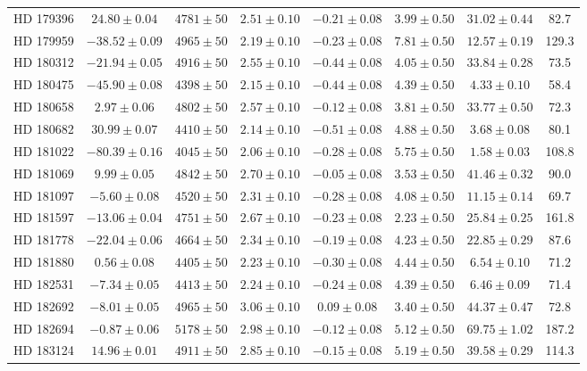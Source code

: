 \begin{table*}
\begin{tabular}{cccccccc}
HD 179396 & $24.80 \pm 0.04$ & $4781 \pm 50$ & $2.51 \pm 0.10$ & $-0.21 \pm 0.08$ & $3.99 \pm 0.50$ & $31.02 \pm 0.44$ & 82.7 \\
HD 179959 & $-38.52 \pm 0.09$ & $4965 \pm 50$ & $2.19 \pm 0.10$ & $-0.23 \pm 0.08$ & $7.81 \pm 0.50$ & $12.57 \pm 0.19$ & 129.3 \\
HD 180312 & $-21.94 \pm 0.05$ & $4916 \pm 50$ & $2.55 \pm 0.10$ & $-0.44 \pm 0.08$ & $4.05 \pm 0.50$ & $33.84 \pm 0.28$ & 73.5 \\
HD 180475 & $-45.90 \pm 0.08$ & $4398 \pm 50$ & $2.15 \pm 0.10$ & $-0.44 \pm 0.08$ & $4.39 \pm 0.50$ & $4.33 \pm 0.10$ & 58.4 \\
HD 180658 & $2.97 \pm 0.06$ & $4802 \pm 50$ & $2.57 \pm 0.10$ & $-0.12 \pm 0.08$ & $3.81 \pm 0.50$ & $33.77 \pm 0.50$ & 72.3 \\
HD 180682 & $30.99 \pm 0.07$ & $4410 \pm 50$ & $2.14 \pm 0.10$ & $-0.51 \pm 0.08$ & $4.88 \pm 0.50$ & $3.68 \pm 0.08$ & 80.1 \\
HD 181022 & $-80.39 \pm 0.16$ & $4045 \pm 50$ & $2.06 \pm 0.10$ & $-0.28 \pm 0.08$ & $5.75 \pm 0.50$ & $1.58 \pm 0.03$ & 108.8 \\
HD 181069 & $9.99 \pm 0.05$ & $4842 \pm 50$ & $2.70 \pm 0.10$ & $-0.05 \pm 0.08$ & $3.53 \pm 0.50$ & $41.46 \pm 0.32$ & 90.0 \\
HD 181097 & $-5.60 \pm 0.08$ & $4520 \pm 50$ & $2.31 \pm 0.10$ & $-0.28 \pm 0.08$ & $4.08 \pm 0.50$ & $11.15 \pm 0.14$ & 69.7 \\
HD 181597 & $-13.06 \pm 0.04$ & $4751 \pm 50$ & $2.67 \pm 0.10$ & $-0.23 \pm 0.08$ & $2.23 \pm 0.50$ & $25.84 \pm 0.25$ & 161.8 \\
HD 181778 & $-22.04 \pm 0.06$ & $4664 \pm 50$ & $2.34 \pm 0.10$ & $-0.19 \pm 0.08$ & $4.23 \pm 0.50$ & $22.85 \pm 0.29$ & 87.6 \\
HD 181880 & $0.56 \pm 0.08$ & $4405 \pm 50$ & $2.23 \pm 0.10$ & $-0.30 \pm 0.08$ & $4.44 \pm 0.50$ & $6.54 \pm 0.10$ & 71.2 \\
HD 182531 & $-7.34 \pm 0.05$ & $4413 \pm 50$ & $2.24 \pm 0.10$ & $-0.24 \pm 0.08$ & $4.39 \pm 0.50$ & $6.46 \pm 0.09$ & 71.4 \\
HD 182692 & $-8.01 \pm 0.05$ & $4965 \pm 50$ & $3.06 \pm 0.10$ & $0.09 \pm 0.08$ & $3.40 \pm 0.50$ & $44.37 \pm 0.47$ & 72.8 \\
HD 182694 & $-0.87 \pm 0.06$ & $5178 \pm 50$ & $2.98 \pm 0.10$ & $-0.12 \pm 0.08$ & $5.12 \pm 0.50$ & $69.75 \pm 1.02$ & 187.2 \\
HD 183124 & $14.96 \pm 0.01$ & $4911 \pm 50$ & $2.85 \pm 0.10$ & $-0.15 \pm 0.08$ & $5.19 \pm 0.50$ & $39.58 \pm 0.29$ & 114.3 \\

\end{tabular}
\end{table*}
